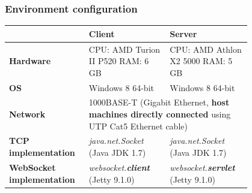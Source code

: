 \documentclass{beamer}
\begin{document}
\begin{frame}
    \frametitle{Environment configuration}
    \begin{table}
        \begin{tabular}{| p{0.2\linewidth}|p{0.3\linewidth}|p{0.3\linewidth} |}
            \hline
                                              & \textbf{Client}                                                                                                                            & \textbf{Server}                                   \\
            \hline
            \hline
            \textbf{Hardware}                 & CPU: AMD Turion II P520 \newline RAM: 6 GB                                                                                                 & CPU: AMD Athlon X2 5000 \newline RAM: 5 GB        \\
            \hline
            \textbf{OS}                       & Windows 8 64-bit                                                                                                                           & Windows 8 64-bit                                  \\
            \hline
            \textbf{Network}                  & \multicolumn{2}{p{0.6\linewidth}|}{1000BASE-T (Gigabit Ethernet, \textbf{host machines directly connected} using UTP Cat5 Ethernet cable)}                                                     \\
            \hline
            \textbf{TCP implementation}       & \textit{java.net.Socket} (Java JDK 1.7)                                                                                                    & \textit{java.net.Socket} (Java JDK 1.7)           \\
            \hline
            \textbf{WebSocket implementation} & \textit{websocket.\textbf{client}} (Jetty 9.1.0)                                                                                           & \textit{websocket.\textbf{servlet}} (Jetty 9.1.0) \\
            \hline
        \end{tabular}
    \end{table}
\end{frame}
\end{document}
